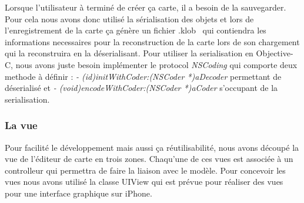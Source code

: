 		Lorsque l'utilisateur à terminé de créer ça carte, il a besoin de la sauvegarder. Pour cela nous avons donc utilisé la sérialisation des objets et lors de l'enregistrement de la carte ça génère un fichier \og .klob \fg \, qui contiendra les informations necessaires pour la reconstruction de la carte lors de son chargement qui la reconstruira en la déserialisant. Pour utiliser la serialisation en Objective-C, nous avons juste besoin implémenter le protocol \textit{NSCoding} qui comporte deux methode à définir : 
		\textit{- (id)initWithCoder:(NSCoder *)aDecoder} permettant de déserialisé et \textit{- (void)encodeWithCoder:(NSCoder *)aCoder} s'occupant de la serialisation.
	
	\subsubsection{La vue}
		Pour facilité le développement mais aussi ça réutilisabilité, nous avons découpé la vue de l'éditeur de carte en trois zones. Chaqu'une de ces vues est associée à un controlleur qui permettra de faire la liaison avec le modèle. Pour concevoir les vues nous avons utilisé la classe UIView qui est prévue pour réaliser des vues pour une interface graphique sur iPhone. 
			
